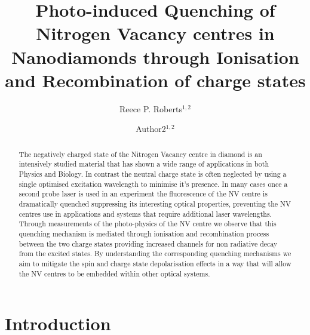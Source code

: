 \documentclass[prl]{revtex4}
\begin{document}
\title{Photo-induced Quenching of Nitrogen Vacancy centres in Nanodiamonds through Ionisation and Recombination of charge states}
  
\author{Reece P. Roberts$^{1,2}$}
\author{Author2$^{1,2}$}



\begin{abstract}
The negatively charged state of the Nitrogen Vacancy centre in diamond is an intensively studied material that has shown a wide range of applications in both Physics and Biology. In contrast the neutral charge state is often neglected by using a single optimised excitation wavelength to minimise it's presence. In many cases once a second probe laser is used in an experiment the fluorescence of the NV centre is dramatically quenched suppressing its interesting optical properties, preventing the NV centres use in applications and systems that require additional laser wavelengths. Through measurements of the photo-physics of the NV centre we observe that this quenching mechanism is mediated through ionisation and recombination process between the two charge states providing increased channels for non radiative decay from the excited states. By understanding the corresponding quenching mechanisms we aim to mitigate the spin and charge state depolarisation effects in a way that will allow the NV centres to be embedded within other optical systems.
\end{abstract}

\maketitle

\section{Introduction}
\end{document}
